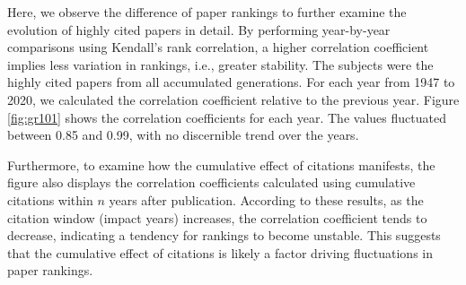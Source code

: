 Here, we observe the difference of paper rankings to further examine the evolution of highly cited papers in detail. 
By performing year-by-year comparisons using Kendall's rank correlation, a higher correlation coefficient implies less variation in rankings, i.e., greater stability. 
The subjects were the highly cited papers from all accumulated generations. For each year from 1947 to 2020, we calculated the correlation coefficient relative to the previous year. Figure \ref{fig:gr101} shows the correlation coefficients for each year. The values fluctuated between 0.85 and 0.99, with no discernible trend over the years. 

Furthermore, to examine how the cumulative effect of citations manifests, the figure also displays the correlation coefficients calculated using cumulative citations within $n$ years after publication. 
According to these results, as the citation window (impact years) increases, the correlation coefficient tends to decrease, indicating a tendency for rankings to become unstable. This suggests that the cumulative effect of citations is likely a factor driving fluctuations in paper rankings.

